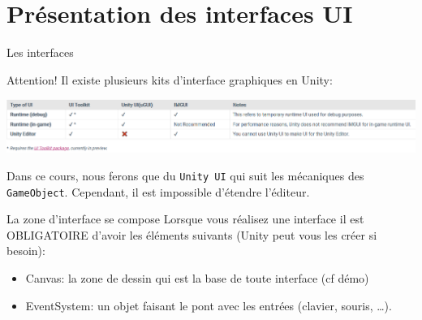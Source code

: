 \section{Présentation des interfaces UI}

\begin{frame}{Les interfaces}
	\vfill
	\begin{alertblock}{Attention!}
		Il existe plusieurs kits d'interface graphiques en Unity:
		
\begin{center}
	\includegraphics[width=\linewidth]{../../imgs/unity_kits_UI}
\end{center}

		Dans ce cours, nous ferons que du \texttt{Unity UI} qui suit les mécaniques des \texttt{GameObject}. Cependant, il est impossible d'étendre l'éditeur.
	\end{alertblock}
	\vfill
	
		\begin{alertblock}{La zone d'interface se compose }
			Lorsque vous réalisez une interface il est OBLIGATOIRE d'avoir les éléments suivants (Unity peut vous les créer si besoin):
			\begin{itemize}
				\item Canvas: la zone de dessin qui est la base de toute interface (cf démo)
				\item EventSystem: un objet faisant le pont avec les entrées (clavier, souris, \ldots).
			\end{itemize}
		\end{alertblock}
	

	\vfill
\end{frame}

